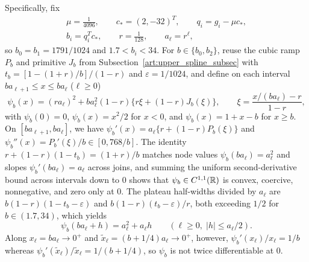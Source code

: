 Specifically, fix
\begin{gather*}
 \mu=\frac1{4096},\qquad c_*=(2,-32)^T,\qquad q_i=g_i-\mu c_*,\\
 b_i=q_i^Tc_*,\qquad r=\frac1{128},\qquad a_\ell=r^\ell,
\end{gather*}
so $b_0=b_1=1791/1024$ and $1.7<b_i<34$. For $b\in\{b_0,b_2\}$, reuse the cubic
ramp $P_b$ and primitive $J_b$ from Subsection~\ref{art:upper_spline_subsec} with
$t_b=[1-(1+r)/b]/(1-r)$ and $\varepsilon=1/1024$, and define on each interval
$ba_{\ell+1}\le x\le ba_\ell$ ($\ell\ge0$)
\begin{equation}\label{art:lower_scalar}
 \psi_b(x)=(ra_\ell)^2+ba_\ell^2(1-r)
       \bigl\{r\xi+(1-r)J_b(\xi)\bigr\},\qquad
 \xi=\frac{x/(ba_\ell)-r}{1-r},
\end{equation}
with $\psi_b(0)=0$, $\psi_b(x)=x^2/2$ for $x<0$, and $\psi_b(x)=1+x-b$ for
$x\ge b$. On $[ba_{\ell+1},ba_\ell]$, we have
$\psi_b'(x)=a_\ell\{r+(1-r)P_b(\xi)\}$ and $\psi_b''(x)=P_b'(\xi)/b\in[0,768/b]$.
The identity $r+(1-r)(1-t_b)=(1+r)/b$ matches node values $\psi_b(ba_\ell)=a_\ell^2$
and slopes $\psi_b'(ba_\ell)=a_\ell$ across joins, and summing the uniform second-derivative
bound across intervals down to $0$ shows that $\psi_b\in C^{1,1}(\mathbb R)$ is convex,
coercive, nonnegative, and zero only at $0$. The plateau half-widths divided by
$a_\ell$ are $b(1-r)(1-t_b-\varepsilon)$ and $b(1-r)(t_b-\varepsilon)/r$, both
exceeding $1/2$ for $b\in(1.7,34)$, which yields
\begin{equation}\label{art:lower_plateau}
 \psi_b(ba_\ell+h)=a_\ell^2+a_\ell h\qquad(\ell\ge0,\;|h|\le a_\ell/2).
\end{equation}
Along $x_\ell=ba_\ell\to0^+$ and $\tilde x_\ell=(b+1/4)a_\ell\to0^+$, however,
$\psi_b'(x_\ell)/x_\ell=1/b$ whereas $\psi_b'(\tilde x_\ell)/\tilde x_\ell=1/(b+1/4)$,
so $\psi_b$ is not twice differentiable at $0$.

